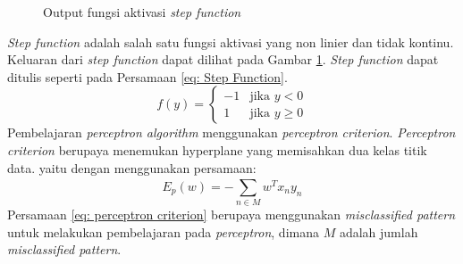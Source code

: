 \begin{figure}[H]
    \centering
    \caption{Output fungsi aktivasi \textit{step function}}
    \label{fig:plot step_function}
\end{figure}

\textit{Step function} adalah salah satu fungsi aktivasi yang non linier dan tidak kontinu. Keluaran dari \textit{step function} dapat dilihat pada Gambar \ref{fig:plot step_function}. \textit{Step function} dapat ditulis seperti pada Persamaan \ref{eq: Step Function}.
\begin{equation}
    f(y) = 
    \begin{cases} 
    -1 & \text{jika } y < 0 \\
    1 & \text{jika } y \geq 0 
    \end{cases}
    \label{eq: Step Function}
\end{equation}
Pembelajaran \textit{perceptron algorithm} menggunakan \textit{perceptron criterion}. \textit{Perceptron criterion} berupaya menemukan hyperplane yang memisahkan dua kelas titik data. yaitu dengan menggunakan persamaan:
\begin{equation}
    E_p(w)=-\sum_{n \in M}^{}w^T x_n y_n
    \label{eq: perceptron criterion}
\end{equation}
Persamaan \ref{eq: perceptron criterion} berupaya menggunakan \textit{misclassified pattern} untuk melakukan pembelajaran pada \textit{perceptron}, dimana $M$ adalah jumlah \textit{misclassified pattern}. 

